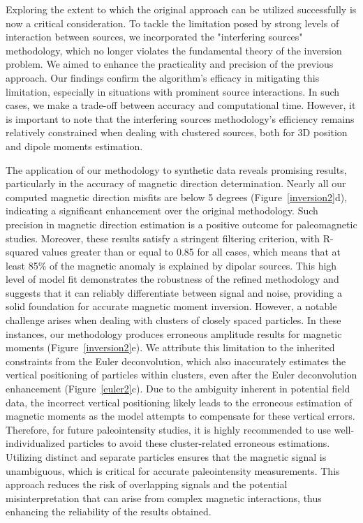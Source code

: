 Exploring the extent to which the original approach can be utilized successfully is now a critical consideration. To tackle the limitation posed by strong levels of interaction between sources, we incorporated the "interfering sources" methodology, which no longer violates the fundamental theory of the inversion problem. We aimed to enhance the practicality and precision of the previous approach. Our findings confirm the algorithm's efficacy in mitigating this limitation, especially in situations with prominent source interactions. In such cases, we make a trade-off between accuracy and computational time. However, it is important to note that the interfering sources methodology's efficiency remains relatively constrained when dealing with clustered sources, both for 3D position and dipole moments estimation.

The application of our methodology to synthetic data reveals promising results, particularly in the accuracy of magnetic direction determination. Nearly all our computed magnetic direction misfits are below 5 degrees (Figure~\ref{inversion2}d), indicating a significant enhancement over the original methodology. Such precision in magnetic direction estimation is a positive outcome for paleomagnetic studies. Moreover, these results satisfy a stringent filtering criterion, with R-squared values greater than or equal to 0.85 for all cases, which means that at least 85\% of the magnetic anomaly is explained by dipolar sources. This high level of model fit demonstrates the robustness of the refined methodology and suggests that it can reliably differentiate between signal and noise, providing a solid foundation for accurate magnetic moment inversion. However, a notable challenge arises when dealing with clusters of closely spaced particles. In these instances, our methodology produces erroneous amplitude results for magnetic moments (Figure~\ref{inversion2}e). We attribute this limitation to the inherited constraints from the Euler deconvolution, which also inaccurately estimates the vertical positioning of particles within clusters, even after the Euler deconvolution enhancement (Figure~\ref{euler2}c). Due to the ambiguity inherent in potential field data, the incorrect vertical positioning likely leads to the erroneous estimation of magnetic moments as the model attempts to compensate for these vertical errors. Therefore, for future paleointensity studies, it is highly recommended to use well-individualized particles to avoid these cluster-related erroneous estimations. Utilizing distinct and separate particles ensures that the magnetic signal is unambiguous, which is critical for accurate paleointensity measurements. This approach reduces the risk of overlapping signals and the potential misinterpretation that can arise from complex magnetic interactions, thus enhancing the reliability of the results obtained.

